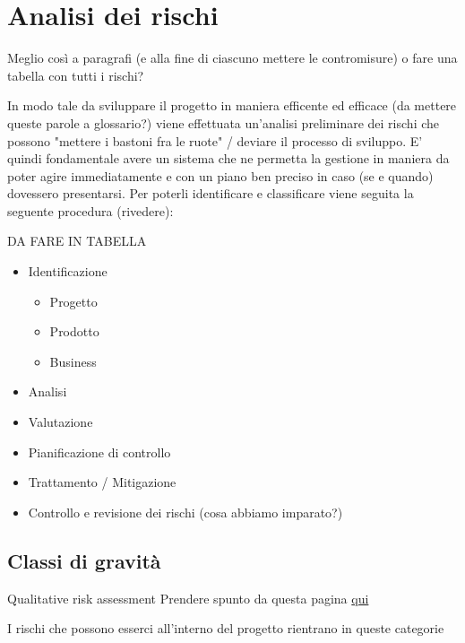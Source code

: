 \newpage
\section{Analisi dei rischi} \label{AnalisiDeiRischi}
	
	Meglio così a paragrafi (e alla fine di ciascuno mettere le contromisure) o fare una tabella con tutti i rischi?
	
	In modo tale da sviluppare il progetto in maniera efficente ed efficace (da mettere queste parole a glossario?) viene effettuata un'analisi preliminare dei rischi che possono "mettere i bastoni fra le ruote" / deviare il processo di sviluppo.
	E' quindi fondamentale avere un sistema che ne permetta la gestione in maniera da poter agire immediatamente e con un piano ben preciso in caso (se e quando) dovessero presentarsi.
	Per poterli identificare e classificare viene seguita la seguente procedura (rivedere):
	
	DA FARE IN TABELLA
	
	\begin{itemize}
		\item Identificazione
		\begin{itemize}
			\item Progetto
			\item Prodotto
			\item Business
		\end{itemize}
		\item Analisi
		\item Valutazione
		\item Pianificazione di controllo
		\item Trattamento / Mitigazione
		\item Controllo e revisione dei rischi (cosa abbiamo imparato?)
	\end{itemize}
	
	\subsection{Classi di gravità}
	Qualitative risk assessment
	Prendere spunto da questa pagina
	\href{https://www.google.com/url?sa=i&rct=j&q=&esrc=s&source=images&cd=&cad=rja&uact=8&ved=2ahUKEwiKvMy9-4rfAhVBMewKHYJYDuIQjRx6BAgBEAU&url=https%3A%2F%2Fstudy.com%2Facademy%2Flesson%2Fqualitative-risk-analysis-benefits-limitations.html&psig=AOvVaw2oFLtWl4og20ZR80HOAo79&ust=1544177442887418}{qui}
	
	I rischi che possono esserci all'interno del progetto rientrano in queste categorie
	
